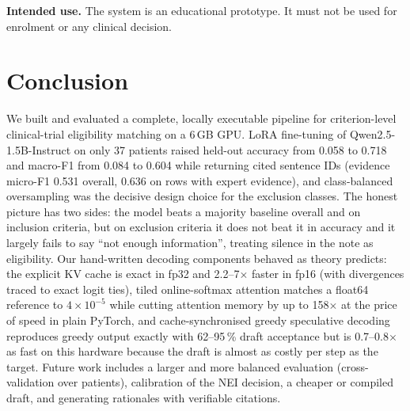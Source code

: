 \textbf{Intended use.} The system is an educational prototype. It must not be used for enrolment or any clinical decision.

\section{Conclusion}
We built and evaluated a complete, locally executable pipeline for criterion-level clinical-trial eligibility matching on a 6\,GB GPU. LoRA fine-tuning of Qwen2.5-1.5B-Instruct on only 37 patients raised held-out accuracy from 0.058 to 0.718 and macro-F1 from 0.084 to 0.604 while returning cited sentence IDs (evidence micro-F1 0.531 overall, 0.636 on rows with expert evidence), and class-balanced oversampling was the decisive design choice for the exclusion classes. The honest picture has two sides: the model beats a majority baseline overall and on inclusion criteria, but on exclusion criteria it does not beat it in accuracy and it largely fails to say ``not enough information'', treating silence in the note as eligibility. Our hand-written decoding components behaved as theory predicts: the explicit KV cache is exact in fp32 and 2.2--7$\times$ faster in fp16 (with divergences traced to exact logit ties), tiled online-softmax attention matches a float64 reference to $4\times10^{-5}$ while cutting attention memory by up to 158$\times$ at the price of speed in plain PyTorch, and cache-synchronised greedy speculative decoding reproduces greedy output exactly with 62--95\,\% draft acceptance but is 0.7--0.8$\times$ as fast on this hardware because the draft is almost as costly per step as the target. Future work includes a larger and more balanced evaluation (cross-validation over patients), calibration of the NEI decision, a cheaper or compiled draft, and generating rationales with verifiable citations.
